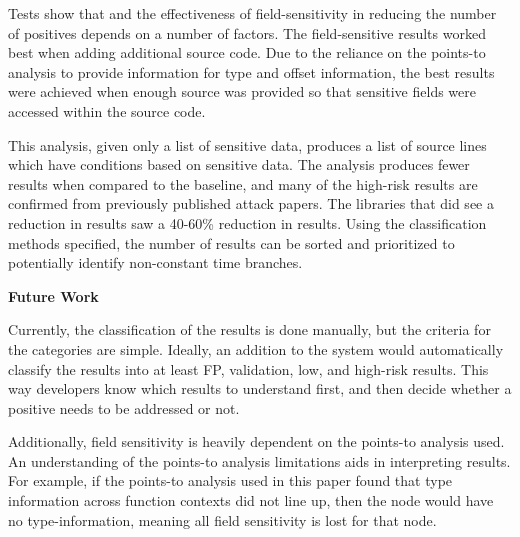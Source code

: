    Tests show that and the effectiveness of field-sensitivity in reducing the
   number of positives depends on a number of factors. The field-sensitive
   results worked best when adding additional source code. Due to the reliance
   on the points-to analysis to provide information for type and offset
   information, the best results were achieved when enough source was provided
   so that sensitive fields were accessed within the source code.

   This analysis, given only a list of sensitive data, produces a list of source
   lines which have conditions based on sensitive data. The analysis produces
   fewer results when compared to the baseline, and many of the high-risk results
   are confirmed from previously published attack papers. The libraries that did
   see a reduction in results saw a 40-60\% reduction in results. Using the
   classification methods specified, the number of results can be sorted and
   prioritized to potentially identify non-constant time branches.


   \noindent
   \textbf{Future Work}

   Currently, the classification of the results is done manually, but the
   criteria for the categories are simple. Ideally, an addition to the system
   would automatically classify the results into at least FP, validation, low,
   and high-risk results. This way developers know which results to understand
   first, and then decide whether a positive needs to be addressed or not.

   Additionally, field sensitivity is heavily dependent on the points-to
   analysis used. An understanding of the points-to analysis limitations aids in
   interpreting results. For example, if the points-to analysis used in this
   paper found that type information across function contexts did not line up,
   then the node would have no type-information, meaning all field sensitivity is
   lost for that node.
